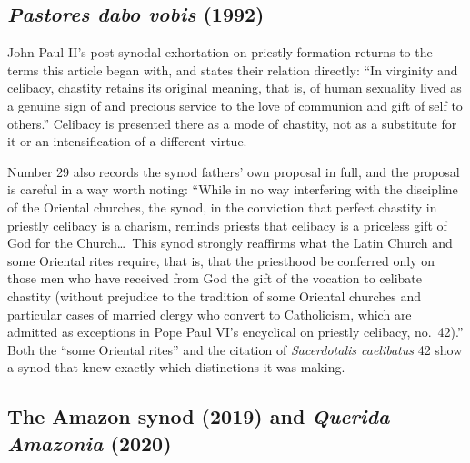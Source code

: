 \subsection{\emph{Pastores dabo vobis} (1992)}

John Paul II's post-synodal exhortation on priestly formation returns to the terms this article began with, and states their relation directly: ``In virginity and celibacy, chastity retains its original meaning, that is, of human sexuality lived as a genuine sign of and precious service to the love of communion and gift of self to others.'' Celibacy is presented there as a mode of chastity, not as a substitute for it or an intensification of a different virtue.

Number 29 also records the synod fathers' own proposal in full, and the proposal is careful in a way worth noting: ``While in no way interfering with the discipline of the Oriental churches, the synod, in the conviction that perfect chastity in priestly celibacy is a charism, reminds priests that celibacy is a priceless gift of God for the Church\ldots\ This synod strongly reaffirms what the Latin Church and some Oriental rites require, that is, that the priesthood be conferred only on those men who have received from God the gift of the vocation to celibate chastity (without prejudice to the tradition of some Oriental churches and particular cases of married clergy who convert to Catholicism, which are admitted as exceptions in Pope Paul VI's encyclical on priestly celibacy, no.~42).'' Both the ``some Oriental rites'' and the citation of \emph{Sacerdotalis caelibatus} 42 show a synod that knew exactly which distinctions it was making.

\subsection{The Amazon synod (2019) and \emph{Querida Amazonia} (2020)}

